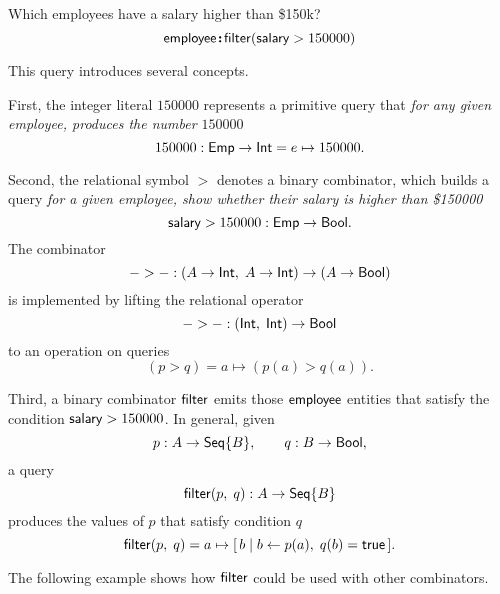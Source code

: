 \begin{demo}
    \label{ex:filter-by-salary}
    Which employees have a salary higher than \$150k?
    \begin{equation*}
        \mathsf{employee}\!\boldsymbol{:}\!\mathsf{filter}(\mathsf{salary}>150000)
    \end{equation*}
\end{demo}

This query introduces several concepts.

First, the integer literal $150000$ represents a primitive query that
\emph{for any given employee, produces the number $150000$}
\begin{equation*}
    150000 : \mathsf{Emp} \to \mathsf{Int} = e \mapsto 150000.
\end{equation*}

Second, the relational symbol ${>}$ denotes a binary combinator, which builds a
query \emph{for a given employee, show whether their salary is higher than
\$150000}
\begin{equation*}
    \mathsf{salary} > 150000 : \mathsf{Emp} \to \mathsf{Bool}.
\end{equation*}
The combinator
\begin{equation*}
    {-}>{-} : (A \to \mathsf{Int},\; A \to \mathsf{Int}) \to (A \to \mathsf{Bool})
\end{equation*}
is implemented by lifting the relational operator
\begin{equation*}
    {-}>{-} : (\mathsf{Int},\; \mathsf{Int}) \to \mathsf{Bool}
\end{equation*}
to an operation on queries
\begin{equation*}
    (p > q) = a \mapsto (p(a) > q(a)).
\end{equation*}

Third, a binary combinator $\mathsf{filter}$ emits those $\mathsf{employee}$ entities that
satisfy the condition $\mathsf{salary} > 150000$.  In general, given
\begin{equation*}
    p : A \to \mathsf{Seq}{\left\{B\right\}}, \qquad q : B \to \mathsf{Bool},
\end{equation*}
a query
\begin{equation*}
    \mathsf{filter}(p,\; q) : A \to \mathsf{Seq}{\left\{B\right\}}
\end{equation*}
produces the values of $p$ that satisfy condition $q$
\begin{equation*}
    \mathsf{filter}(p,\; q) = a \mapsto [\,b \mid b \gets p(a),\; q(b)=\mathsf{true}\,].
\end{equation*}

The following example shows how $\mathsf{filter}$ could be used with other combinators.

